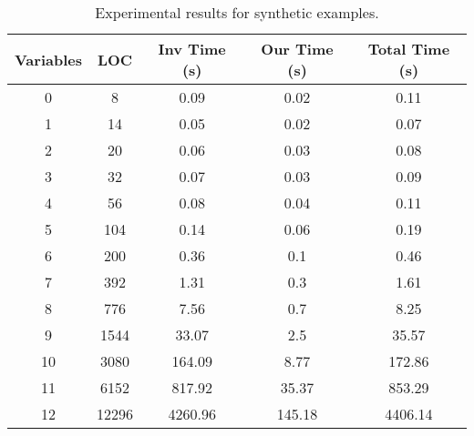 \begin{center}
\begin{table}[]
  \centering
   \begin{tabular}{c|c|c|c|c}

{Variables} & {LOC} & {Inv Time (s)} & {Our Time (s)} & {Total Time (s)
} \\\hline
{0} & {8} & {0.09} & {0.02} & {0.11} \\\hline
{1} & {14} & {0.05} & {0.02} & {0.07} \\\hline
{2} & {20} & {0.06} & {0.03} & {0.08} \\\hline
{3} & {32} & {0.07} & {0.03} & {0.09} \\\hline
{4} & {56} & {0.08} & {0.04} & {0.11} \\\hline
{5} & {104} & {0.14} & {0.06} & {0.19} \\\hline
{6} & {200} & {0.36} & {0.1} & {0.46} \\\hline
{7} & {392} & {1.31} & {0.3} & {1.61} \\\hline
{8} & {776} & {7.56} & {0.7} & {8.25} \\\hline
{9} & {1544} & {33.07} & {2.5} & {35.57} \\\hline
{10} & {3080} & {164.09} & {8.77} & {172.86} \\\hline
{11} & {6152} & {817.92} & {35.37} & {853.29} \\\hline
{12} & {12296} & {4260.96} & {145.18} & {4406.14} \\\hline
\end{tabular}
\caption{Experimental results for synthetic examples.}\label{tab:exp2}
\end{table}
\end{center}
